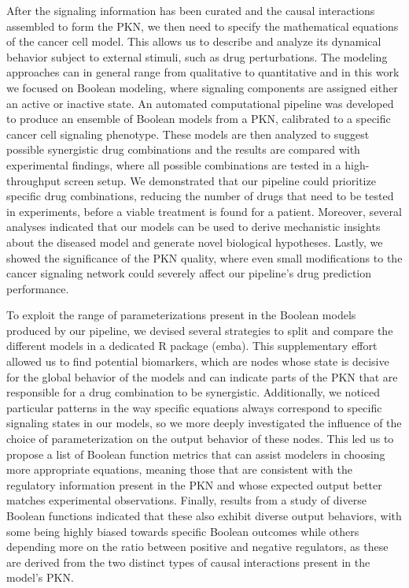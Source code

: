 \documentclass[
  12pt,
]{book}
\begin{document}
After the signaling information has been curated and the causal interactions assembled to form the PKN, we then need to specify the mathematical equations of the cancer cell model. This allows us to describe and analyze its dynamical behavior subject to external stimuli, such as drug perturbations. The modeling approaches can in general range from qualitative to quantitative and in this work we focused on Boolean modeling, where signaling components are assigned either an active or inactive state. An automated computational pipeline was developed to produce an ensemble of Boolean models from a PKN, calibrated to a specific cancer cell signaling phenotype. These models are then analyzed to suggest possible synergistic drug combinations and the results are compared with experimental findings, where all possible combinations are tested in a high-throughput screen setup. We demonstrated that our pipeline could prioritize specific drug combinations, reducing the number of drugs that need to be tested in experiments, before a viable treatment is found for a patient. Moreover, several analyses indicated that our models can be used to derive mechanistic insights about the diseased model and generate novel biological hypotheses. Lastly, we showed the significance of the PKN quality, where even small modifications to the cancer signaling network could severely affect our pipeline's drug prediction performance.

To exploit the range of parameterizations present in the Boolean models produced by our pipeline, we devised several strategies to split and compare the different models in a dedicated R package (emba). This supplementary effort allowed us to find potential biomarkers, which are nodes whose state is decisive for the global behavior of the models and can indicate parts of the PKN that are responsible for a drug combination to be synergistic. Additionally, we noticed particular patterns in the way specific equations always correspond to specific signaling states in our models, so we more deeply investigated the influence of the choice of parameterization on the output behavior of these nodes. This led us to propose a list of Boolean function metrics that can assist modelers in choosing more appropriate equations, meaning those that are consistent with the regulatory information present in the PKN and whose expected output better matches experimental observations. Finally, results from a study of diverse Boolean functions indicated that these also exhibit diverse output behaviors, with some being highly biased towards specific Boolean outcomes while others depending more on the ratio between positive and negative regulators, as these are derived from the two distinct types of causal interactions present in the model's PKN.
\end{document}
